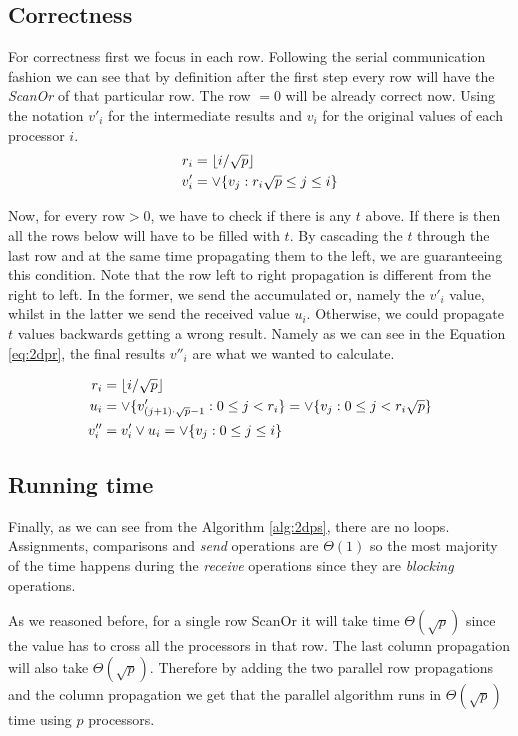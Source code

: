 \documentclass[a4paper]{article}
\begin{document}
    \newpage
    \subsection{Correctness}

    For correctness first we focus in each row. Following the serial communication fashion we can see that by definition after the first step every row will have the \emph{ScanOr} of that particular row. The row $= 0$ will be already correct now. Using the notation $v'_i$ for the intermediate results and $v_i$ for the original values of each processor $i$.
    \begin{align}
        r_i &= \lfloor i / \sqrt{p}\rfloor\\
        v'_i &= \vee\{ v_j : r_i \sqrt{p} \leq j \leq i \}
    \end{align}

    Now, for every $\text{row} > 0$, we have to check if there is any $t$ above. If there is then all the rows below will have to be filled with $t$. By cascading the $t$ through the last row and at the same time propagating them to the left, we are guaranteeing this condition. Note that the row left to right propagation is different from the right to left. In the former, we send the accumulated or, namely the $v'_i$ value, whilst in the latter we send the received value $u_i$. Otherwise, we could propagate $t$ values backwards getting a wrong result. Namely as we can see in the Equation \ref{eq:2dpr}, the final results $v''_i$ are what we wanted to calculate.

    \begin{align}
        \label{eq:2dpr}
        r_i &= \lfloor i / \sqrt{p}\rfloor\\
        u_i &= \vee\{v'_{(j+1)\cdot\sqrt{p}-1} : 0 \leq j < r_i \} = \vee\{v_j : 0 \leq j < r_i\sqrt{p}\}\\
        v''_i &= v'_i \vee  u_i = \vee\{v_j : 0 \leq j \leq i\}
    \end{align}
    \hfill\qedsymbol

    \subsection{Running time}

    Finally, as we can see from the Algorithm \ref{alg:2dps}, there are no loops. Assignments, comparisons and \emph{send} operations are $\Theta(1)$ so the most majority of the time happens during the \emph{receive} operations since they are \emph{blocking} operations.

    As we reasoned before, for a single row ScanOr it will take time $\Theta(\sqrt{p})$ since the value has to cross all the processors in that row. The last column propagation will also take $\Theta(\sqrt{p})$. Therefore by adding the two parallel row propagations and the column propagation we get that the parallel algorithm runs in $\Theta(\sqrt{p})$ time using $p$ processors.
\end{document}
